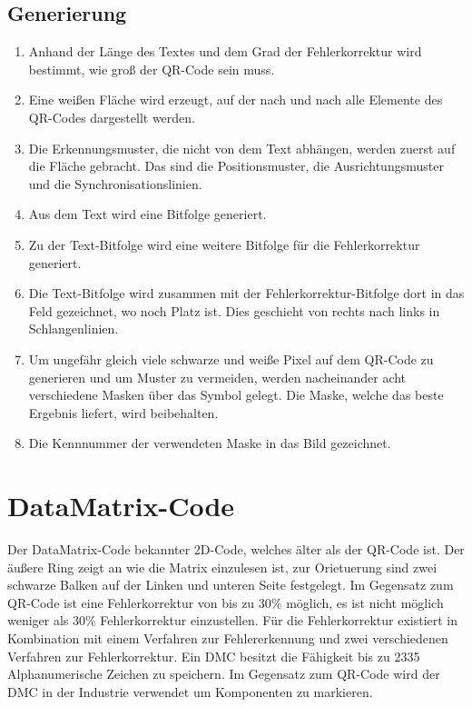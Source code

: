 \documentclass[12pt,					%
							 oneside,			%
							 a4paper,			%
							 halfparskip,		%
							 liststotoc,			%
							 bibtotoc,			%
							 fleqn,				%
							 pointlessnumbers]	%
							 {scrreprt}
\begin{document}
\subsection{Generierung}
\begin{enumerate}
\item Anhand der Länge des Textes und dem Grad der Fehlerkorrektur wird bestimmt, wie groß der QR-Code sein muss. 
\item Eine weißen Fläche wird erzeugt, auf der nach und nach alle Elemente des QR-Codes dargestellt werden. 
\item Die Erkennungsmuster, die nicht von dem Text abhängen, werden zuerst auf die Fläche gebracht. Das sind die Positionsmuster, die  Ausrichtungsmuster und die Synchronisationslinien.
\item Aus dem Text wird eine Bitfolge generiert.
\item Zu der Text-Bitfolge wird eine weitere Bitfolge für die Fehlerkorrektur generiert.
\item Die Text-Bitfolge wird zusammen mit der Fehlerkorrektur-Bitfolge dort in das Feld gezeichnet, wo noch Platz ist. Dies geschieht von rechts nach links in Schlangenlinien.
\item Um ungefähr gleich viele schwarze und weiße Pixel auf dem QR-Code zu generieren und um Muster zu vermeiden, werden nacheinander acht verschiedene Masken über das Symbol gelegt. Die Maske, welche das beste Ergebnis liefert, wird beibehalten.
\item Die Kennnummer der verwendeten Maske in das Bild gezeichnet.
\end{enumerate}

\newpage
\section{DataMatrix-Code}
Der DataMatrix-Code bekannter 2D-Code, welches älter als der QR-Code ist. Der äußere Ring zeigt an wie die Matrix einzulesen ist, zur Orietuerung sind zwei schwarze Balken auf der Linken und unteren Seite festgelegt. \cite{matrix}
Im Gegensatz zum QR-Code ist eine Fehlerkorrektur von bis zu 30\% möglich, es ist nicht möglich weniger als 30\% Fehlerkorrektur einzustellen. Für die Fehlerkorrektur existiert in Kombination mit einem Verfahren zur Fehlererkennung und zwei verschiedenen Verfahren zur Fehlerkorrektur. 
Ein DMC besitzt die Fähigkeit bis zu 2335 Alphanumerische Zeichen zu speichern. Im Gegensatz zum QR-Code wird der DMC in der Industrie verwendet um Komponenten zu markieren.
\end{document}
